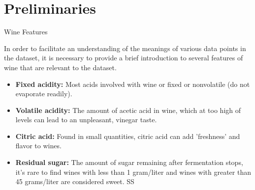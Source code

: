 \documentclass[
 size=14pt,
 paper=smartboard,  %
 mode=present, 		%
 display=slides, 	%
 style=tuliplab,  	%
 pauseslide,
 fleqn,leqno]{powerdot}
\begin{document}
\section{Preliminaries}

\begin{slide}{Wine Features}

In order to facilitate an understanding of the meanings of various data points in the dataset, it is necessary to provide a brief introduction to several features of wine that are relevant to the dataset.
	\begin{itemize}
	\item \textbf{Fixed acidity:} Most acids involved with wine or fixed or nonvolatile (do not evaporate readily).
	\item \textbf{Volatile acidity:} The amount of acetic acid in wine, which at too high of levels can lead to an unpleasant, vinegar taste.
	\item \textbf{Citric acid:} Found in small quantities, citric acid can add 'freshness' and flavor to wines.
	\item \textbf{Residual sugar:} The amount of sugar remaining after fermentation stops, it's rare to find wines with less than 1 gram/liter and wines with greater than 45 grams/liter are considered sweet.
	SS
\end{itemize}
	
\end{slide}

\end{document}
